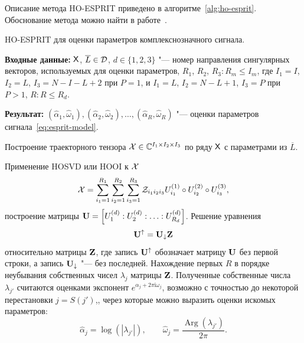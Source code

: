 \documentclass[specialist,
  substylefile=spbu_report.rtx,
subf,href,colorlinks=true, 12pt]{disser}
\theoremstyle{plain}
\theoremstyle{definition}
\theoremstyle{remark}
\newcommand{\Input}{\textbf{Входные данные: }}
\newcommand{\Output}{\textbf{Результат: }}
\newcommand{\iu}{\mathrm{i}}
\begin{document}
Описание метода HO-ESPRIT приведено в алгоритме~\ref{alg:ho-esprit}.
Обоснование метода можно найти в работе~\cite{hosvd-hooi-separation}.
\begin{algorithm}[!ht]
  \caption{HO-ESPRIT для оценки параметров комплекснозначного сигнала.}
  \label{alg:ho-esprit}
  \Input $\mathsf{X}$, $\overline{L} \in \mathcal{D}$,
  $d\in \{1, 2, 3\}$ "--- номер направления сингулярных векторов,
  используемых для оценки параметров,
  $R_1$, $R_2$, $R_3: R_m \leqslant I_m$, где
  $I_1=I$, $I_2=L$, $I_3=N-I-L+2$ при $P=1$, и
  $I_1=L$, $I_2=N-L+1$, $I_3=P$ при $P >1$,
  $R: R\leqslant R_d$.

  \Output $\left(\widehat{\alpha}_1, \widehat{\omega}_1\right),
  \left(\widehat{\alpha}_2, \widehat{\omega}_2\right), \ldots,
  \left(\widehat{\alpha}_R, \widehat{\omega}_R\right)$ "--- оценки параметров
  сигнала~\eqref{eq:esprit-model}.
  \begin{algorithmic}[1]
    \State Построение траекторного тензора $\mathcal{X}\in \mathbb{C}^{I_1\times
    I_2 \times I_3}$
    по ряду $\mathsf{X}$ с параметрами из $\overline{L}$.

    \State Применение HOSVD или HOOI к $\mathcal{X}$
    \[
      \mathcal{X} = \sum_{i_1=1}^{R_1} \sum_{i_2=1}^{R_2} \sum_{i_3=1}^{R_3}
      \mathcal{Z}_{i_1 i_2 i_3} U_{i_1}^{(1)}\circ U_{i_2}^{(2)} \circ
      U_{i_3}^{(3)},
    \]
    построение матрицы $\mathbf{U} = \left[U_1^{(d)}:U_2^{(d)}:\ldots:
    U_{R_d}^{(d)}\right]$.
    \State Решение уравнения
    \[
      \mathbf{U}^{\uparrow}=\mathbf{U}_{\downarrow}\mathbf{Z}
    \]
    относительно матрицы $\mathbf{Z}$, где запись $\mathbf{U}^{\uparrow}$
    обозначает матрицу $\mathbf{U}$ без первой строки,
    а запись $\mathbf{U}_{\downarrow}$ "--- без последней.
    \State Нахождение первых $R$ в порядке неубывания собственных
    чисел $\lambda_j$ матрицы $\mathbf{Z}$.
    Полученные собственные числа $\lambda_{j'}$ считаются оценками
    экспонент $e^{\alpha_j + 2\pi\iu \omega_j}$, возможно с точностью
    до некоторой перестановки
    $j = S (j')$,, через которые можно выразить
    оценки искомых параметров:
    \[
      \widehat{\alpha}_j = \log\left(\left|\lambda_{j'}\right|\right), \qquad
      \widehat{\omega}_j =
      \frac{\operatorname{Arg}\left(\lambda_{j'}\right)}{2 \pi}.
    \]
  \end{algorithmic}
\end{algorithm}
\end{document}
